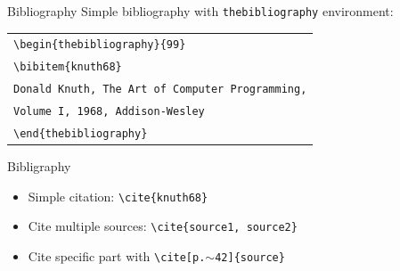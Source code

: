 \documentclass[11pt]{beamer}
\newcommand{\bs}{\textbackslash}
\begin{document}
\begin{frame}{Bibliography}
  Simple bibliography with \texttt{thebibliography} environment:

  \vspace{0.5cm}
  \begin{center}\begin{tabular}{l}
    \texttt{\bs begin\{thebibliography\}\{99\}} \\
    \texttt{\qquad\bs bibitem\{knuth68\}} \\
    \texttt{\qquad\qquad Donald Knuth, The Art of Computer Programming,} \\
    \texttt{\qquad\qquad Volume I, 1968, Addison-Wesley}\\
    \texttt{\bs end\{thebibliography\}}
  \end{tabular}\end{center}

\end{frame}


\begin{frame}{Bibligraphy}
  \begin{itemize}
    \item Simple citation: \texttt{\bs cite\{knuth68\}}

    \vspace{0.3cm}
    \item Cite multiple sources: \texttt{\bs cite\{source1, source2\}}

    \vspace{0.3cm}
    \item Cite specific part with \texttt{\bs cite[p.$\sim$42]\{source\}}
  \end{itemize}
\end{frame}
\end{document}
